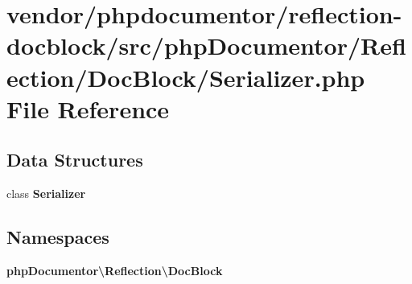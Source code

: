 \section{vendor/phpdocumentor/reflection-\/docblock/src/php\+Documentor/\+Reflection/\+Doc\+Block/\+Serializer.php File Reference}
\label{phpdocumentor_2reflection-docblock_2src_2php_documentor_2_reflection_2_doc_block_2_serializer_8php}
\subsection*{Data Structures}
\begin{DoxyCompactItemize}
\item 
class {\bf Serializer}
\end{DoxyCompactItemize}
\subsection*{Namespaces}
\begin{DoxyCompactItemize}
\item 
 {\bf php\+Documentor\textbackslash{}\+Reflection\textbackslash{}\+Doc\+Block}
\end{DoxyCompactItemize}

